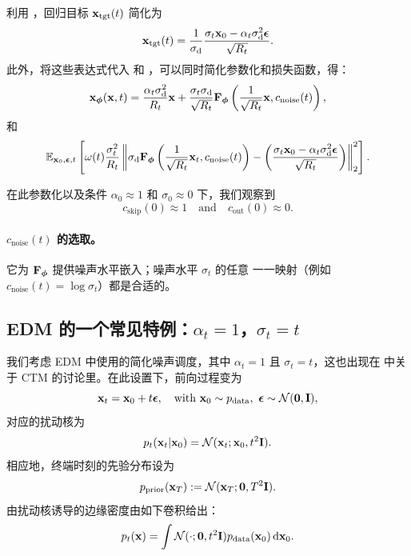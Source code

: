 利用 ，回归目标 ${\mathbf{x}}_{\mathrm{tgt}}(t)$ 简化为
\[
{\mathbf{x}}_{\mathrm{tgt}}(t) = \frac{1}{\sigma_{\mathrm{d}}}\frac{\sigma_t {\mathbf{x}}_0 - \alpha_t \sigma_{\mathrm{d}}^2\bm{\epsilon} }{\sqrt{R_t}}.
\] 
此外，将这些表达式代入  和 ，可以同时简化参数化和损失函数，得：
\begin{align*}
    {\mathbf{x}}_{\bm{\phi}}({\mathbf{x}}, t)=\frac{\alpha_t \sigma_{\mathrm{d}}^2 }{R_t} {\mathbf{x}} + \frac{\sigma_t \sigma_{\mathrm{d}} }{\sqrt{R_t}}{\mathbf{F}}_{\bm{\phi}}\left(\frac{1}{\sqrt{R_t}}{\mathbf{x}}, c_{\mathrm{noise}}(t)\right),
\end{align*}
和
\begin{align*}
   \mathbb{E}_{{\mathbf{x}}_0, \bm{\epsilon}, t} \left[\omega(t)\frac{\sigma_t^2  }{R_t}\left\lVert \sigma_{\mathrm{d}} {\mathbf{F}}_{\bm{\phi}}\left(\frac{1}{\sqrt{R_t}}{\mathbf{x}}_t, c_{\mathrm{noise}}(t)\right) - \left(\frac{\sigma_t {\mathbf{x}}_0 - \alpha_t \sigma_{\mathrm{d}}^2\bm{\epsilon} }{\sqrt{R_t}}\right)\right\rVert_2^2\right].
\end{align*}

在此参数化以及条件 $\alpha_0 \approx 1$ 和 $\sigma_0 \approx 0$ 下，我们观察到
\[
c_{\mathrm{skip}}(0) \approx 1 \quad \text{and} \quad c_{\mathrm{out}}(0) \approx 0.
\] 


\paragraph{$c_{\mathrm{noise}}(t)$ 的选取。}
它为 ${\mathbf{F}}_{\bm{\phi}}$ 提供噪声水平嵌入；噪声水平 $\sigma_t$ 的任意
一一映射（例如 $c_{\mathrm{noise}}(t)=\log \sigma_t$）都是合适的。

\subsection{EDM 的一个常见特例：$\alpha_t = 1$，$\sigma_t = t$}

我们考虑 EDM 中使用的简化噪声调度，其中 $\alpha_t = 1$ 且 $\sigma_t = t$，这也出现在  中关于 CTM 的讨论里。在此设置下，前向过程变为
\[
{\mathbf{x}}_t = {\mathbf{x}}_0 + t\bm{\epsilon}, \quad \text{with } {\mathbf{x}}_0 \sim p_{\text{data}}, \,\, \bm{\epsilon} \sim \mathcal{N}(\bm{0}, {\mathbf{I}}),
\]
对应的扰动核为
\[
p_t({\mathbf{x}}_t|{\mathbf{x}}_0) = \mathcal{N}({\mathbf{x}}_t; {\mathbf{x}}_0, t^2{\mathbf{I}}).
\]
相应地，终端时刻的先验分布设为
\[
p_{\text{prior}}({\mathbf{x}}_T) := \mathcal{N}({\mathbf{x}}_T; \bm{0}, T^2 {\mathbf{I}}).
\]
由扰动核诱导的边缘密度由如下卷积给出：
\begin{align*}
    p_t({\mathbf{x}}) = \int \mathcal{N}(\cdot; \bm{0}, t^2 {\mathbf{I}})p_{\text{data}}({\mathbf{x}}_0)\mathop{}\!\mathrm{d} {\mathbf{x}}_0.
\end{align*}

